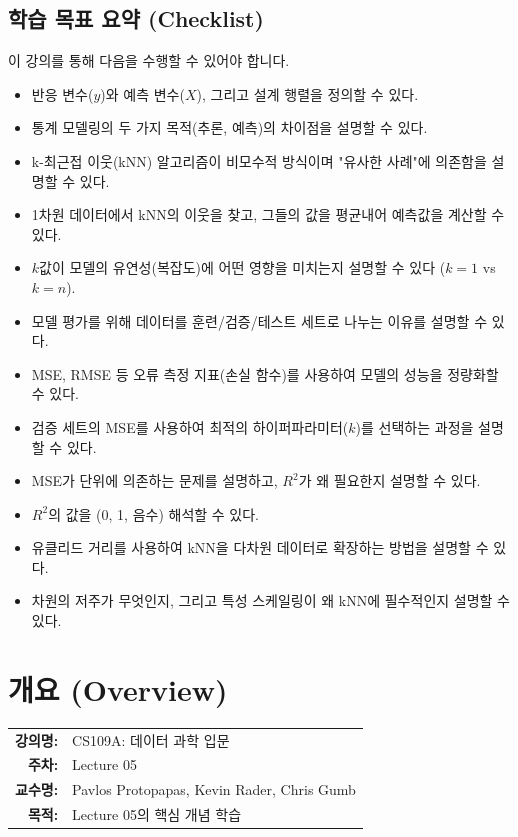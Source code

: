 \documentclass[11pt,a4paper]{book}
\makeatletter
\theoremstyle{definition}
\newcommand{\metainfo}[4]{
\begin{tcolorbox}[
    colback=lightpurple,
    colframe=darkpurple,
    boxrule=1pt,
    arc=2mm,
    left=10pt,
    right=10pt,
    top=8pt,
    bottom=8pt
]
\begin{tabular}{@{}rl@{}}
\textbf{강의명:} & #1 \\[0.3em]
\textbf{주차:} & #2 \\[0.3em]
\textbf{교수명:} & #3 \\[0.3em]
\textbf{목적:} & \begin{minipage}[t]{0.75\textwidth}#4\end{minipage}
\end{tabular}
\end{tcolorbox}
}
\makeatother
\begin{document}
\section{학습 목표 요약 (Checklist)}

이 강의를 통해 다음을 수행할 수 있어야 합니다.

\begin{itemize}[label=$\square$]
    \item 반응 변수($y$)와 예측 변수($X$), 그리고 설계 행렬을 정의할 수 있다.
    \item 통계 모델링의 두 가지 목적(추론, 예측)의 차이점을 설명할 수 있다.
    \item k-최근접 이웃(kNN) 알고리즘이 비모수적 방식이며 "유사한 사례"에 의존함을 설명할 수 있다.
    \item 1차원 데이터에서 kNN의 이웃을 찾고, 그들의 값을 평균내어 예측값을 계산할 수 있다.
    \item $k$값이 모델의 유연성(복잡도)에 어떤 영향을 미치는지 설명할 수 있다 ($k=1$ vs $k=n$).
    \item 모델 평가를 위해 데이터를 훈련/검증/테스트 세트로 나누는 이유를 설명할 수 있다.
    \item MSE, RMSE 등 오류 측정 지표(손실 함수)를 사용하여 모델의 성능을 정량화할 수 있다.
    \item 검증 세트의 MSE를 사용하여 최적의 하이퍼파라미터($k$)를 선택하는 과정을 설명할 수 있다.
    \item MSE가 단위에 의존하는 문제를 설명하고, $R^2$가 왜 필요한지 설명할 수 있다.
    \item $R^2$의 값을 (0, 1, 음수) 해석할 수 있다.
    \item 유클리드 거리를 사용하여 kNN을 다차원 데이터로 확장하는 방법을 설명할 수 있다.
    \item 차원의 저주가 무엇인지, 그리고 특성 스케일링이 왜 kNN에 필수적인지 설명할 수 있다.
\end{itemize}


\chapter{개요 (Overview)}
\label{ch:lecture5}

\metainfo{CS109A: 데이터 과학 입문}{Lecture 05}{Pavlos Protopapas, Kevin Rader, Chris Gumb}{Lecture 05의 핵심 개념 학습}
\end{document}

